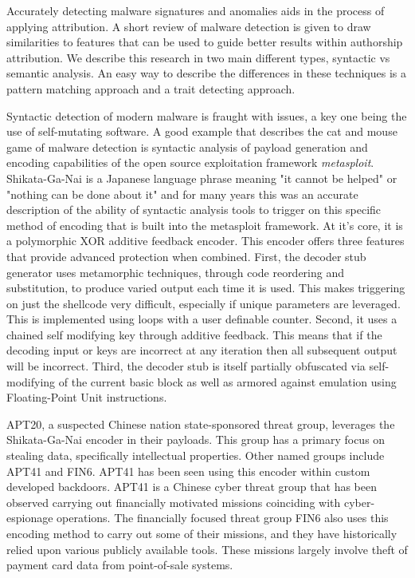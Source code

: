 \documentclass[12pt]{report}
\begin{document}
Accurately detecting malware signatures and anomalies aids in the process of applying attribution.  A short review of malware detection is given to draw similarities to features that can be used to guide better results within authorship attribution.  We describe this research in two main different types, syntactic vs semantic analysis.  An easy way to describe the differences in these techniques is a pattern matching approach and a trait detecting approach.

Syntactic detection of modern malware is fraught with issues, a key one being the use of self-mutating software.  A good example that describes the cat and mouse game of malware detection is syntactic analysis of payload generation and encoding capabilities of the open source exploitation framework \emph{metasploit}.  Shikata-Ga-Nai is a Japanese language phrase meaning "it cannot be helped" or "nothing can be done about it" and for many years this was an accurate description of the ability of syntactic analysis tools to trigger on this specific method of encoding that is built into the metasploit framework.  At it's core, it is a polymorphic XOR additive feedback encoder.  This encoder offers three features that provide advanced protection when combined.  First, the decoder stub generator uses metamorphic techniques, through code reordering and substitution, to produce varied output each time it is used.  This makes triggering on just the shellcode very difficult, especially if unique parameters are leveraged.  This is implemented using loops with a user definable counter.  Second, it uses a chained self modifying key through additive feedback. This means that if the decoding input or keys are incorrect at any iteration then all subsequent output will be incorrect.  Third, the decoder stub is itself partially obfuscated via self-modifying of the current basic block as well as armored against emulation using Floating-Point Unit instructions.  

APT20, a suspected Chinese nation state-sponsored threat group, leverages the Shikata-Ga-Nai encoder in their payloads.  This group has a primary focus on stealing data, specifically intellectual properties.  Other named groups include APT41 and FIN6.  APT41 has been seen using this encoder within custom developed backdoors.  APT41 is a Chinese cyber threat group that has been observed carrying out financially motivated missions coinciding with cyber-espionage operations.  The financially focused threat group FIN6 also uses this encoding method to carry out some of their missions, and they have historically relied upon various publicly available tools. These missions largely involve theft of payment card data from point-of-sale systems. 
\end{document}
